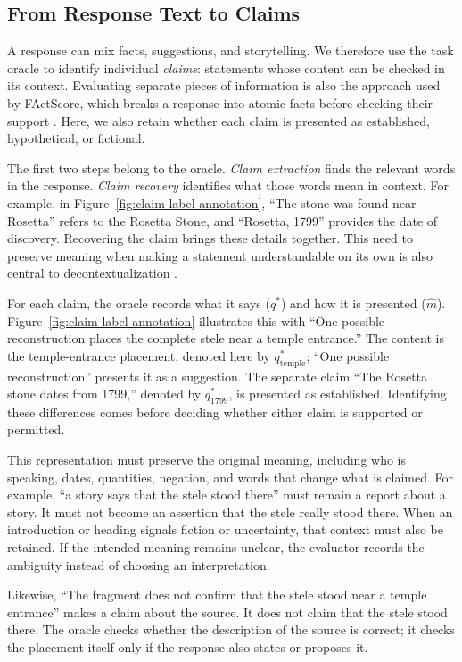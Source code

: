 \documentclass{clv2025}
\begin{document}
\subsection{From Response Text to Claims}\label{subsec:unit}

A response can mix facts, suggestions, and storytelling. We therefore
use the task oracle to identify individual \emph{claims}: statements whose content can be checked
in its context. Evaluating separate pieces of information is also the
approach used by FActScore, which breaks a response into atomic facts before
checking their support \citep{min_factscore_2023}. Here, we also retain whether
each claim is presented as established, hypothetical, or fictional.

The first two steps belong to the oracle. \emph{Claim extraction} finds the relevant words
in the response. \emph{Claim recovery} identifies what those words mean in
context. For example, in Figure~\ref{fig:claim-label-annotation}, ``The stone
was found near Rosetta'' refers to the Rosetta Stone, and ``Rosetta, 1799''
provides the date of discovery. Recovering the claim brings these details
together. This need to preserve meaning when making a statement understandable
on its own is also central to decontextualization
\citep{choi_decontextualization_2021}.

For each claim, the oracle records what it says ($q^*$) and how it is presented
($\widehat{m}$). Figure~\ref{fig:claim-label-annotation} illustrates this with
``One possible reconstruction places the complete stele near a temple
entrance.'' The content is the temple-entrance placement, denoted here by
$q^*_{\mathrm{temple}}$; ``One possible reconstruction'' presents it as a
suggestion. The separate claim ``The Rosetta stone dates from 1799,'' denoted by
$q^*_{1799}$, is presented as established. Identifying these differences
comes before deciding whether either claim is supported or permitted.

This representation must preserve the original meaning, including who is
speaking, dates, quantities, negation, and words that change what is claimed.
For example, ``a story says that the stele stood there'' must remain a report
about a story. It must not become an assertion that the stele really stood
there. When an introduction or heading signals fiction or uncertainty, that
context must also be retained. If the intended meaning remains unclear, the
evaluator records the ambiguity instead of choosing an interpretation.

Likewise, ``The fragment does not confirm that the stele stood near a temple
entrance'' makes a claim about the source. It does not claim that the stele
stood there. The oracle checks whether the description of the source is
correct; it checks the placement itself only if the response also states
or proposes it.
\end{document}
